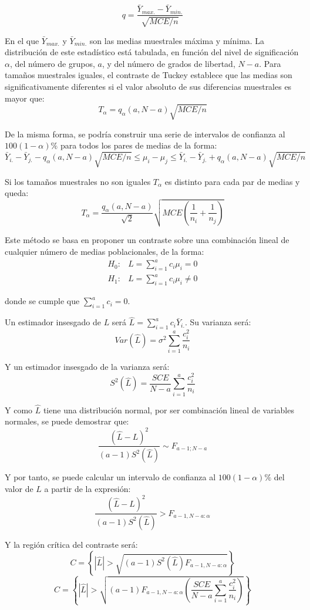 \[q=\dfrac{\bar{Y}_{max.}-\bar{Y}_{min.}}{\sqrt{MCE/n}}\]

En el que $\bar{Y}_{max.}$ y $\bar{Y}_{min.}$ son las medias muestrales m\'axima y m\'inima. La distribuci\'on de este estad\'istico est\'a tabulada, en funci\'on del nivel de significaci\'on $\alpha$, del n\'umero de grupos, $a$, y del n\'umero de grados de libertad, $N-a$. Para tama\~nos muestrales iguales, el contraste de Tuckey establece que las medias son significativamente diferentes si el valor absoluto de sus diferencias muestrales es mayor que:
\[T_{\alpha}=q_{\alpha}(a,N-a)\sqrt{MCE/n}\]

De la misma forma, se podr\'ia construir una serie de intervalos de confianza al $100(1-\alpha)\%$ para todos los pares de medias de la forma:
\[\bar{Y}_{i.}-\bar{Y}_{j.}-q_{\alpha}(a,N-a)\sqrt{MCE/n}\leq\mu_i-\mu_j\leq\bar{Y}_{i.}-\bar{Y}_{j.}+q_{\alpha}(a,N-a)\sqrt{MCE/n}\]

Si los tama\~nos muestrales no son iguales $T_{\alpha}$ es distinto para cada par de medias y queda:
\[T_{\alpha}=\dfrac{q_{\alpha}(a,N-a)}{\sqrt{2}}\sqrt{MCE\left(\dfrac{1}{n_i}+\dfrac{1}{n_j}\right)}\]


Este m\'etodo se basa en proponer un contraste sobre una combinaci\'on lineal de cualquier n\'umero de medias poblacionales, de la forma:
\begin{align}
H_0:&L=\sum_{i=1}^ac_i\mu_i=0\\
H_1:&L=\sum_{i=1}^ac_i\mu_i\neq0
\end{align}

donde se cumple que $\sum_{i=1}^ac_i=0$.

Un estimador insesgado de $L$ ser\'a $\hat{L}=\sum_{i=1}^ac_i\bar{Y}_{i.}$. Su varianza ser\'a:
\[Var(\hat{L})=\sigma^2\sum_{i=1}^a\dfrac{c_i^2}{n_i}\]

Y un estimador insesgado de la varianza ser\'a:
\[S^2(\hat{L})=\dfrac{SCE}{N-a}\sum_{i=1}^a\dfrac{c_i^2}{n_i}\]

Y como $\hat{L}$ tiene una distribuci\'on normal, por ser combinaci\'on lineal de variables normales, se puede demostrar que:
\[\dfrac{(\hat{L}-L)^2}{(a-1)S^2(\hat{L})}\sim F_{a-1;N-a}\]

Y por tanto, se puede calcular un intervalo de confianza al $100(1-\alpha)\%$ del valor de $L$ a partir de la expresi\'on:
\[\dfrac{(\hat{L}-L)^2}{(a-1)S^2(\hat{L})}> F_{a-1,N-a:\alpha}\]

Y la regi\'on cr\'itica del contraste ser\'a: 
\[C=\left\{|\hat{L}|>\sqrt{(a-1)S^2(\hat{L})F_{a-1,N-a:\alpha}}\right\}\]
\[C=\left\{|\hat{L}|>\sqrt{(a-1)F_{a-1,N-a:\alpha}\left(\dfrac{SCE}{N-a}\sum_{i=1}^a\dfrac{c_i^2}{n_i}\right)}\right\}\]


